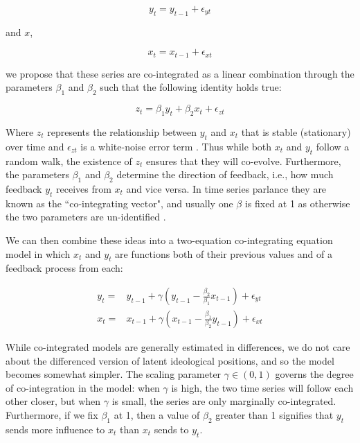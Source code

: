 \documentclass[12pt]{article}
\begin{document}
\begin{equation}
	y_t = y_{t-1} + \epsilon_{yt}
\end{equation}

and $x$,

\begin{equation}
x_t = x_{t-1} + \epsilon_{xt}
\end{equation}

we propose that these series are co-integrated as a linear combination through the parameters $\beta_1$ and $\beta_2$ such that the following identity holds true:

\begin{equation}
z_t = \beta_1 y_t + \beta_2 x_t + \epsilon_{zt}
\end{equation}

Where $z_t$ represents the relationship between $y_t$ and $x_t$ that is stable (stationary) over time and $\epsilon_{zt}$ is a white-noise error term \parencite[253]{engle1987}. Thus while both $x_t$ and $y_t$ follow a random walk, the existence of $z_t$ ensures that they will co-evolve. Furthermore, the parameters $\beta_1$ and $\beta_2$ determine the direction of feedback, i.e., how much feedback $y_t$ receives from $x_t$ and vice versa. In time series parlance they are known as the ``co-integrating vector", and usually one $\beta$ is fixed at 1 as otherwise the two parameters are un-identified \parencite[253]{timeseries2014}. 

We can then combine these ideas into a two-equation co-integrating equation model in which $x_t$ and $y_t$ are functions both of their previous values and of a feedback process from each:

\begin{align}
 y_t =& y_{t-1} + \gamma (y_{t-1} - \frac{\beta_2}{\beta_1}x_{t-1}) + \epsilon_{yt}\\
  x_t =& x_{t-1} + \gamma (x_{t-1} - \frac{\beta_1}{\beta_2}y_{t-1}) + \epsilon_{xt}
\end{align}

While co-integrated models are generally estimated in differences, we do not care about the differenced version of latent ideological positions, and so the model becomes somewhat simpler. The scaling parameter $\gamma \in (0,1)$ governs the degree of co-integration in the model: when $\gamma$ is high, the two time series will follow each other closer, but when $\gamma$ is small, the series are only marginally co-integrated. Furthermore, if we fix $\beta_1$ at 1, then a value of $\beta_2$ greater than 1 signifies that $y_t$ sends more influence to $x_t$ than $x_t$ sends to $y_t$. 
\end{document}

